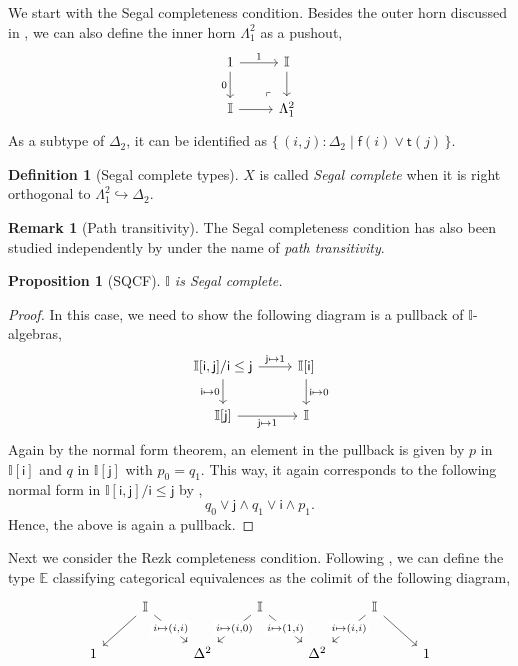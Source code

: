 \documentclass[a4paper,12pt]{amsart}
\newtheorem{proposition}[theorem]{Proposition}
\theoremstyle{definition}
\newtheorem{definition}[theorem]{Definition}
\newtheorem{remark}[theorem]{Remark}
\newcommand{\mbb}[1]{\mathbb{#1}}
\newcommand{\I}{\mbb I}
\newcommand{\ms}[1]{\mathsf{#1}}
\newcommand{\scomp}[2]{\{\,#1\mid#2\,\}}
\newcommand{\hook}{\hookrightarrow}
\newcommand\istsym{\ms{t}}
\newcommand\isfsym{\ms{f}}
\newcommand\ist[1]{\istsym(#1)}
\newcommand\isf[1]{\isfsym(#1)}
\begin{document}
We start with the Segal completeness condition. Besides the outer horn discussed in , we can also define the inner horn $\Lambda^2_1$ as a pushout,
\[
  \begin{tikzcd}
    1 \ar[d, "0"'] \ar[r, "1"] & \I \ar[d] \\
    \I \ar[r] & \Lambda^2_1
    \arrow["\lrcorner"{anchor=center, pos=0.125, rotate=180}, draw=none, from=2-2, to=1-1]
  \end{tikzcd}
\]
As a subtype of $\Delta_2$, it can be identified as $\scomp{(i,j) : \Delta_2}{\isf{i} \vee \ist{j}}$.

\begin{definition}[Segal complete types]
  $X$ is called \emph{Segal complete} when it is right orthogonal to $\Lambda^2_1 \hook \Delta_2$.
\end{definition}

\begin{remark}[Path transitivity]
  The Segal completeness condition has also been studied independently by \citet{fiore2001domains} under the name of \emph{path transitivity}.
\end{remark}

\begin{proposition}[SQCF]
  $\I$ is Segal complete.
\end{proposition}
\begin{proof}
  In this case, we need to show the following diagram is a pullback of $\I$-algebras, 
  \[
  \begin{tikzcd}
    \I[\ms{i},\ms{j}]/\ms{i}\le\ms{j} \ar[r, "\ms{j} \mapsto 1"] \ar[d, "\ms{i} \mapsto 0"'] & \I[\ms{i}] \ar[d, "\ms{i}\mapsto 0"] \\
    \I[\ms{j}] \ar[r, "\ms{j} \mapsto 1"'] & \I
  \end{tikzcd}
  \]
  Again by the normal form theorem, an element in the pullback is given by $p$ in $\I[\ms{i}]$ and $q$ in $\I[\ms{j}]$ with $p_0 = q_1$. This way, it again corresponds to the following normal form in $\I[\ms{i},\ms{j}]/\ms{i} \le \ms{j}$ by ,
  \[ q_0 \vee \ms{j} \wedge q_1 \vee \ms{i} \wedge p_1\text{.} \]
  Hence, the above is again a pullback.
\end{proof}

Next we consider the Rezk completeness condition. Following \citet{buchholtz2021synthetic}, we can define the type $\mbb E$ classifying categorical equivalences as the colimit of the following diagram,
\[
\begin{tikzcd}
	& \I && \I && \I \\
	1 && {\Delta^2} && {\Delta^2} && 1
	\arrow[from=1-2, to=2-1]
	\arrow["{i \mapsto (i,i)}"{description}, from=1-2, to=2-3]
	\arrow["{i \mapsto (i,0)}"{description}, from=1-4, to=2-3]
	\arrow["{i \mapsto (1,i)}"{description}, from=1-4, to=2-5]
	\arrow["{i \mapsto (i,i)}"{description}, from=1-6, to=2-5]
	\arrow[from=1-6, to=2-7]
\end{tikzcd}
\]
\end{document}
